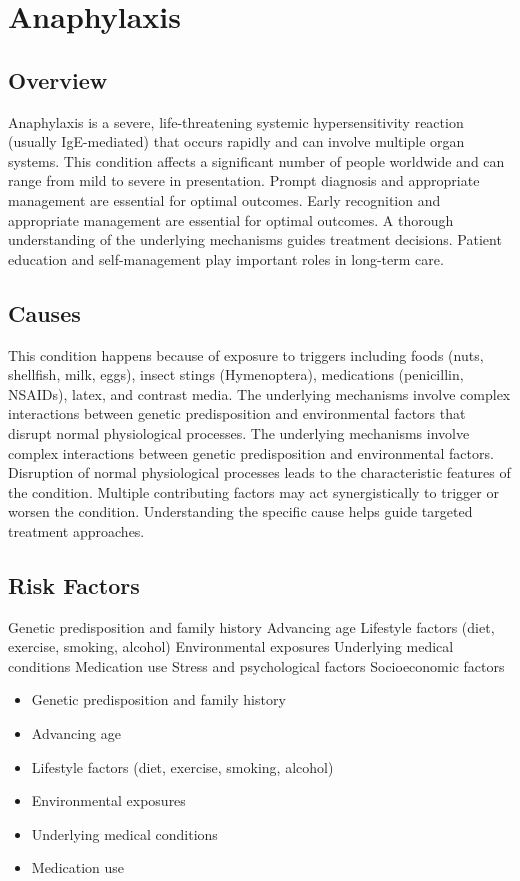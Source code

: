 \chapter{Anaphylaxis}
\label{sec:Anaphylaxis}

\section{Overview}
Anaphylaxis is a severe, life-threatening systemic hypersensitivity reaction (usually IgE-mediated) that occurs rapidly and can involve multiple organ systems. This condition affects a significant number of people worldwide and can range from mild to severe in presentation. Prompt diagnosis and appropriate management are essential for optimal outcomes. Early recognition and appropriate management are essential for optimal outcomes. A thorough understanding of the underlying mechanisms guides treatment decisions. Patient education and self-management play important roles in long-term care.
\section{Causes}
This condition happens because of exposure to triggers including foods (nuts, shellfish, milk, eggs), insect stings (Hymenoptera), medications (penicillin, NSAIDs), latex, and contrast media. The underlying mechanisms involve complex interactions between genetic predisposition and environmental factors that disrupt normal physiological processes. The underlying mechanisms involve complex interactions between genetic predisposition and environmental factors. Disruption of normal physiological processes leads to the characteristic features of the condition. Multiple contributing factors may act synergistically to trigger or worsen the condition. Understanding the specific cause helps guide targeted treatment approaches.
\section{Risk Factors}
Genetic predisposition and family history Advancing age Lifestyle factors (diet, exercise, smoking, alcohol) Environmental exposures Underlying medical conditions Medication use Stress and psychological factors Socioeconomic factors

\begin{itemize}[noitemsep]
  \item Genetic predisposition and family history
  \item Advancing age
  \item Lifestyle factors (diet, exercise, smoking, alcohol)
  \item Environmental exposures
  \item Underlying medical conditions
  \item Medication use
\end{itemize}
